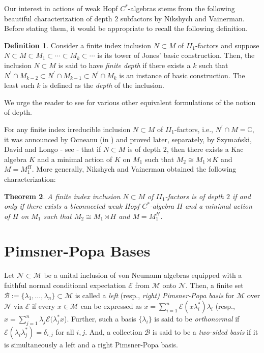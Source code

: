 \documentclass{amsart}
\newtheorem{theorem}{Theorem}[section]
\theoremstyle{definition}
\newtheorem{definition}[theorem]{Definition}
\theoremstyle{theorem}
\newcommand{\C}{\mathbb{C}}
\begin{document}
Our interest in actions of weak Hopf $C^*$-algebras stems from the
following beautiful characterization of depth $2$ subfactors by
Nikshych and Vainerman.  Before stating them, it would be appropriate
to recall the following definition.
\begin{definition}\label{depth-defn}
 Consider a finite index inclusion $N\subset M$ of $II_1$-factors and
 suppose $N\subset M\subset M_1\subset \cdots \subset M_k\subset
 \cdots $ is its tower of Jones' basic construction. Then, the
 inclusion $N\subset M$ is said to have \textit{finite depth} if there
 exists a $k$ such that $N^{\prime}\cap M_{k-2}\subset N^{\prime}\cap
 M_{k-1}\subset N^{\prime}\cap M_{k}$ is an instance of basic
 construction.  The least such $k$ is defined as the \textit{depth} of
 the inclusion.
 \end{definition}\color{black}
We urge the reader to see \cite{GHJ} for various other equivalent
formulations of the notion of depth.\smallskip

For any finite index irreducible inclusion $N\subset M$ of $II_1$-factors, i.e.,
$N^{\prime}\cap M=\C$, it was announced by Ocneanu (in \cite{Ocn}) and
proved later, separately, by Szyma\'{n}ski, David and Longo  - see \cite{Szy,
  Dav, L} - that if $N \subset M$ is of depth $2$, then there exists a
 Kac algebra $K$ and a minimal action of $K$ on
$M_1$ such that $M_2\cong M_1\rtimes K$  and $M = M_1^H$. More generally,
Nikshych and Vainerman obtained the following characterization:
\begin{theorem}\cite{NV1, BNS}
 A finite index inclusion $N\subset M$ of $II_1$-factors is of depth
 $2$ if and only if there exists a biconnected weak Hopf
 $C^*$-algebra $H$ and a minimal action of $H$ on $M_1$ such that
 $M_2\cong M_1\rtimes H$ and
 $M = M_1^H$.
\end{theorem}

\color{black}


\section{Pimsner-Popa Bases}
Let $\mathcal{N}\subset \mathcal{M}$ be a unital inclusion of von
Neumann algebras equipped with a faithful normal conditional
expectation $\mathcal{E}$ from $\mathcal{M}$ onto $\mathcal{N}$. Then,
a finite set $\mathcal{B}:=\{\lambda_1,\ldots,\lambda_n\}\subset
\mathcal{M}$ is called a {\it left} (resp., {\it right) Pimsner-Popa
  basis} for $\mathcal{M}$ over $\mathcal{N}$ via $\mathcal{E}$ if
every $x\in \mathcal{M}$ can be expressed as $x=\sum_{i=1}^n
\mathcal{E}(x\lambda^*_i)\lambda_i$ (resp.,
$x=\sum_{j=1}^n\lambda_j\mathcal{E}(\lambda^*_jx$). Further, such a basis $\{\lambda_i\}$
is said to be {\it orthonormal} if $\mathcal{E}(\lambda_i \lambda_j^*)
= \delta_{i,j}$ for all $i, j$. And, a collection $\mathcal{B}$
is said to be a {\it two-sided basis} if it is simultaneously a left
and a right Pimsner-Popa basis.
\end{document}
